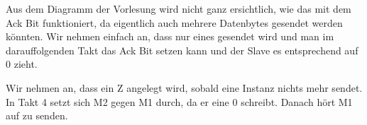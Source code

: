 \documentclass[a4paper]{scrartcl}
\begin{document}
\begin{enumerate}[(a)]
		Aus dem Diagramm der Vorlesung wird nicht ganz ersichtlich, wie das mit dem Ack Bit funktioniert, da eigentlich auch mehrere Datenbytes gesendet werden könnten. Wir nehmen einfach an, dass nur eines gesendet wird und man im darauffolgenden Takt das Ack Bit setzen kann und der Slave es entsprechend auf 0 zieht.
		
		
		Wir nehmen an, dass ein Z angelegt wird, sobald eine Instanz nichts mehr sendet.\\
		In Takt 4 setzt sich M2 gegen M1 durch, da er eine 0 schreibt. Danach hört M1 auf zu senden.
		
	\end{enumerate}

	
\end{document}
